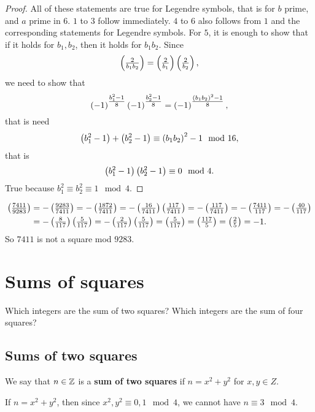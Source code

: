\begin{proof}
All of these statements are true for Legendre symbols, that is for $ b $ prime, and $ a $ prime in $ 6 $. $ 1 $ to $ 3 $ follow immediately. $ 4 $ to $ 6 $ also follows from $ 1 $ and the corresponding statements for Legendre symbols. For $ 5 $, it is enough to show that if it holds for $ b_1, b_2 $, then it holds for $ b_1b_2 $. Since
$$ \left( \tfrac{2}{b_1b_2} \right) = \left( \tfrac{2}{b_1} \right)\left( \tfrac{2}{b_2} \right), $$
we need to show that
$$ \left( -1 \right)^{\tfrac{b_1^2 - 1}{8}}\left( -1 \right)^{\tfrac{b_2^2 - 1}{8}} = \left( -1 \right)^{\tfrac{\left( b_1b_2 \right)^2 - 1}{8}}, $$
that is need
$$ \left( b_1^2 - 1 \right) + \left( b_2^2 - 1 \right) \equiv \left( b_1b_2 \right)^2 - 1 \mod 16, $$
that is
$$ \left( b_1^2 - 1 \right)\left( b_2^2 - 1 \right) \equiv 0 \mod 4. $$
True because $ b_1^2 \equiv b_2^2 \equiv 1 \mod 4 $.
\end{proof}

\begin{example2}
\begin{align*}
\left( \tfrac{7411}{9283} \right)
& = -\left( \tfrac{9283}{7411} \right) = -\left( \tfrac{1872}{7411} \right) = -\left( \tfrac{16}{7411} \right)\left( \tfrac{117}{7411} \right) = -\left( \tfrac{117}{7411} \right) = -\left( \tfrac{7411}{117} \right) = -\left( \tfrac{40}{117} \right) \\
& = -\left( \tfrac{8}{117} \right)\left( \tfrac{5}{117} \right) = -\left( \tfrac{2}{117} \right)\left( \tfrac{5}{117} \right) = \left( \tfrac{5}{117} \right) = \left( \tfrac{117}{5} \right) = \left( \tfrac{2}{5} \right) = -1.
\end{align*}
So $ 7411 $ is not a square mod $ 9283 $.
\end{example2}

\pagebreak

\section{Sums of squares}

Which integers are the sum of two squares? Which integers are the sum of four squares?

\subsection{Sums of two squares}

\begin{definition}
We say that $ n \in \mathbb{Z} $ is a \textbf{sum of two squares} if $ n = x^2 + y^2 $ for $ x, y \in Z $.
\end{definition}

\begin{example2}
If $ n = x^2 + y^2 $, then since $ x^2, y^2 \equiv 0, 1 \mod 4 $, we cannot have $ n \equiv 3 \mod 4 $.
\end{example2}

